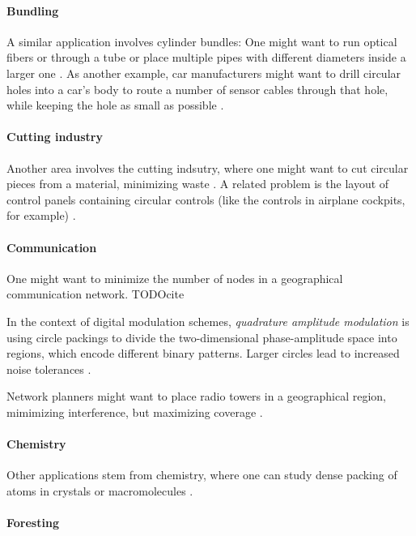 \documentclass[a4paper,style=print,bibliography=totoc,nexus,lnum,extramargin]{tubsbook}
\begin{document}
\paragraph{Bundling}

A similar application involves cylinder bundles:
One might want to run optical fibers or through a tube or place multiple pipes with different diameters inside a larger one \parencite{WHZX2002improved}. As another example, car manufacturers might want to drill circular holes into a car's body to route a number of sensor cables through that hole, while keeping the hole as small as possible \cite{SSSKK2004disk}.

\paragraph{Cutting industry}

Another area involves the cutting indsutry, where one might want to cut circular pieces from a material, minimizing waste \cite{SMCSCG2007new}.
A related problem is the layout of control panels containing circular controls (like the controls in airplane cockpits, for example) \parencite{CKP2008solving}.

\paragraph{Communication}

One might want to minimize the number of nodes in a geographical communication network. TODOcite

In the context of digital modulation schemes, \emph{quadrature amplitude modulation} is using circle packings to divide the two-dimensional phase-amplitude space into regions, which encode different binary patterns. Larger circles lead to increased noise tolerances \parencite{PWMD1992packing}.

Network planners might want to place radio towers in a geographical region, mimimizing interference, but maximizing coverage \parencite{SMCSCG2007new}.

\paragraph{Chemistry}

Other applications stem from chemistry, where one can study dense packing of atoms in crystals or macromolecules \cite{WMP1994history}.

\paragraph{Foresting}
\end{document}
